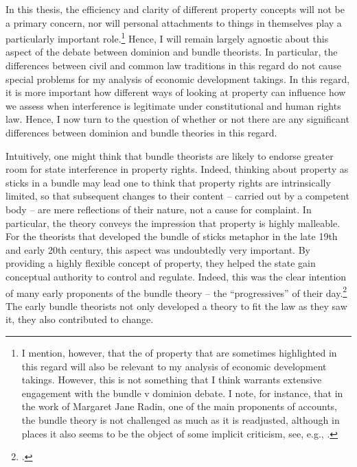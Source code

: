 In this thesis, the efficiency and clarity of different property concepts will not be a primary concern, nor will personal attachments to things in themselves play a particularly important role.\footnote{I mention, however, that the  of property that are sometimes highlighted in this regard will also be relevant to my analysis of economic development takings. However, this is not something that I think warrants extensive engagement with the bundle v dominion debate. I note, for instance, that in the work of Margaret Jane Radin, one of the main proponents of  accounts, the bundle theory is not challenged as much as it is readjusted, although in places it also seems to be the object of some implicit criticism, see, e.g., \cite[127-130]{radin93}.}
Hence, I will remain largely agnostic about this aspect of the debate between dominion and bundle theorists. In particular, the differences between civil and common law traditions in this regard do not cause special problems for my analysis of economic development takings. In this regard, it is more important how different ways of looking at property can influence how we assess when interference is legitimate under constitutional and human rights law. Hence, I now turn to the question of whether or not there are any significant differences between dominion and bundle theories in this regard.

Intuitively, one might think that bundle theorists are likely to endorse greater room for state interference in property rights. Indeed, thinking about property as sticks in a bundle may lead one to think that property rights are intrinsically limited, so that subsequent changes to their content -- carried out by a competent body -- are mere reflections of their nature, not a cause for complaint. In particular, the theory conveys the impression that property is highly malleable. For the theorists that developed the bundle of sticks metaphor in the late 19th and early 20th century, this aspect was undoubtedly very important. By providing a highly flexible concept of property, they helped the state gain conceptual authority to control and regulate. Indeed, this was the clear intention of many early proponents of the bundle theory -- the ``progressives'' of their day.\footcite[195]{klein11} The early bundle theorists not only developed a theory to fit the law as they saw it, they also contributed to change.

